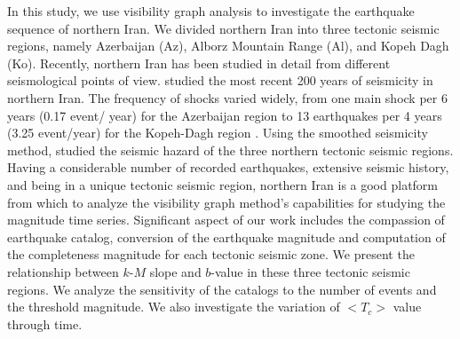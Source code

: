 In this study, we use visibility graph analysis to investigate the earthquake sequence of northern Iran. We divided northern Iran into three tectonic seismic regions, namely Azerbaijan (Az), Alborz Mountain Range (Al), and Kopeh Dagh (Ko).  Recently, northern Iran has been studied in detail from different seismological points of view.  \citet{Nemati2015} studied the most recent 200 years of seismicity in northern Iran. The frequency of shocks varied widely, from one main shock per 6 years (0.17 event/ year) for the Azerbaijan region to 13 earthquakes per 4 years (3.25 event/year) for the Kopeh-Dagh region \citep{Nemati2015}. Using the smoothed seismicity method, \citet{Khoshnevis2016} studied the seismic hazard of the three northern tectonic seismic regions. Having a considerable number of recorded earthquakes, extensive seismic history, and being in a unique tectonic seismic region, northern Iran is a good platform from which to analyze the visibility graph method's capabilities for studying the magnitude time series. Significant aspect of our work includes the compassion of earthquake catalog, conversion of the earthquake magnitude and computation of the completeness magnitude for each tectonic seismic zone. We present the relationship between  $k$-$M$  slope and $b$-value in these three tectonic seismic regions. We analyze the sensitivity of the catalogs to the number of events and the threshold magnitude. We also investigate the variation of  $<T_c>$  value through time. 
